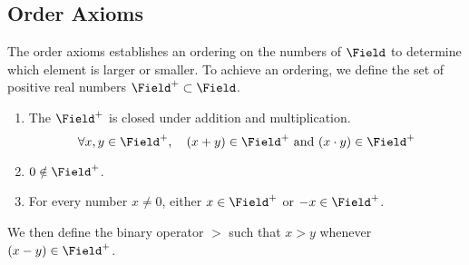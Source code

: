 \subsection{Order Axioms}
The order axioms establishes an ordering on the numbers of \(\Field\) to determine which element is larger or smaller. To achieve an ordering, we define the set of positive real numbers \(\Field^+ \subset \Field\).
\begin{enumerate}[wide,resume,label={Axiom \arabic*.}]
    \item The \(\Field^+\) is closed under addition and multiplication.
          \begin{equation*} \forall x,y \in \Field^+, \quad (x + y) \in \Field^+ \text{ and } (x \cdot y) \in \Field^+ \end{equation*}
    \item \(0 \notin \Field^+\).
    \item For every number \(x \neq 0\), either \(x \in \Field^+\) or \(-x \in \Field^+\).
\end{enumerate}
We then define the binary operator \( > \) such that \(x > y \) whenever \((x - y) \in \Field^+\).

